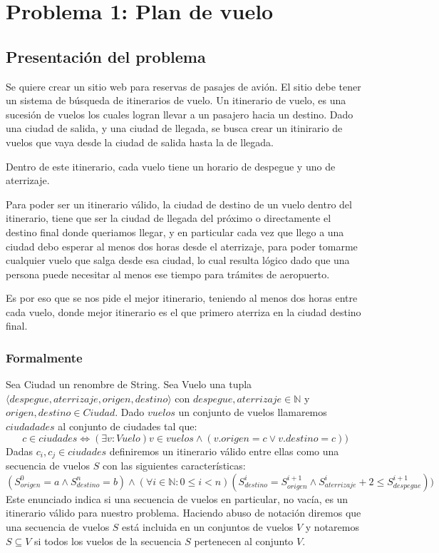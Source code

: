 \section{Problema 1: Plan de vuelo}

\subsection{Presentación del problema}

Se quiere crear un sitio web para reservas de pasajes de avi\'on. El sitio debe tener un sistema de b\'usqueda de itinerarios de vuelo. Un itinerario de vuelo, es una sucesi\'on de vuelos los cuales logran llevar a un pasajero hacia un destino. Dado una ciudad de salida, y una ciudad de llegada, se busca crear un itinirario de vuelos que vaya desde la ciudad de salida hasta la de llegada.

Dentro de este itinerario, cada vuelo tiene un horario de despegue y uno de aterrizaje. 

Para poder ser un itinerario v\'alido, la ciudad de destino de un vuelo dentro del itinerario, tiene que ser la ciudad de llegada del pr\'oximo o directamente el destino final donde queriamos llegar, y en particular cada vez que llego a una ciudad debo esperar al menos dos horas desde el aterrizaje, para poder tomarme cualquier vuelo que salga desde esa ciudad, lo cual resulta l\'ogico dado que una persona puede necesitar al menos ese tiempo para tr\'amites de aeropuerto.

Es por eso que se nos pide el mejor itinerario, teniendo al menos dos horas entre cada vuelo, donde mejor itinerario es el que primero aterriza en la ciudad destino final.

\subsubsection{Formalmente}

Sea Ciudad un renombre de String. Sea Vuelo una tupla $\langle despegue, aterrizaje, origen, destino \rangle$ con $despegue, aterrizaje \in \mathbb{N}$
y $origen, destino \in Ciudad$. Dado $vuelos$ un conjunto de vuelos llamaremos $ciudadades$ al conjunto de ciudades tal que:
\begin{displaymath}
  c \in ciudades  \Leftrightarrow (\exists v:Vuelo) v \in vuelos \wedge (v.origen = c \vee v.destino = c))
\end{displaymath}
Dadas  $c_i, c_j \in ciudades$ definiremos un itinerario válido entre ellas como una secuencia de vuelos $S$
con las siguientes características:
\begin{displaymath}
(S^{0}_{origen} = a \wedge S^{n}_{destino} = b) \wedge 
(\forall i \in \mathbb{N} : 0 \leq i < n)(S^{i}_{destino} = S^{i+1}_{origen} 
\wedge S^{i}_{aterrizaje} + 2 \leq S^{i+1}_{despegue}))
\end{displaymath}
Este enunciado indica si una secuencia de vuelos en particular, no vacía, es un itinerario válido para nuestro problema.
Haciendo abuso de notación diremos que una secuencia de vuelos $S$ está incluida en un conjuntos de vuelos $V$ y
notaremos $S \subseteq V$ si todos los vuelos de la secuencia $S$ pertenecen al conjunto $V$.


